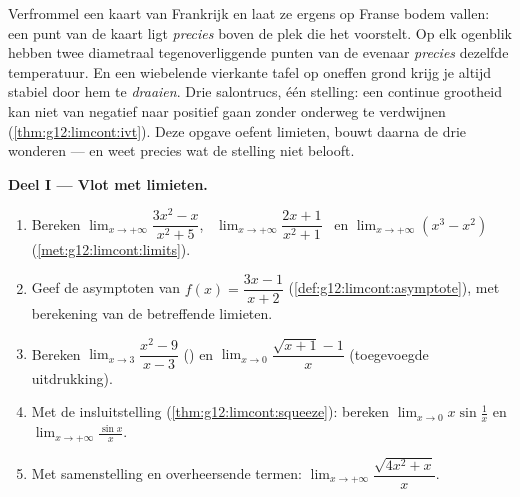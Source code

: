 \begin{problem}
\label{pb:g12:limcont:1}
Verfrommel een kaart van Frankrijk en laat ze ergens op Franse bodem vallen:
een punt van de kaart ligt \emph{precies} boven de plek die het voorstelt. Op
elk ogenblik hebben twee diametraal tegenoverliggende punten van de evenaar
\emph{precies} dezelfde temperatuur. En een wiebelende vierkante tafel op
oneffen grond krijg je altijd stabiel door hem te \emph{draaien}. Drie
salontrucs, één stelling: een continue grootheid kan niet van negatief naar
positief gaan zonder onderweg te verdwijnen (\cref{thm:g12:limcont:ivt}). Deze
opgave oefent limieten, bouwt daarna de drie wonderen --- en weet precies wat
de stelling niet belooft.

\medskip
\noindent\textbf{Deel I --- Vlot met limieten.}
\begin{enumerate}
  \item Bereken $\lim_{x \to +\infty} \dfrac{3x^2 - x}{x^2 + 5}$, \
        $\lim_{x \to +\infty} \dfrac{2x + 1}{x^2 + 1}$ \ en
        $\lim_{x \to +\infty} (x^3 - x^2)$
        (\cref{met:g12:limcont:limits}).
  \item Geef de asymptoten van $f(x) = \dfrac{3x - 1}{x + 2}$
        (\cref{def:g12:limcont:asymptote}), met berekening van de betreffende
        limieten.
  \item Bereken $\lim_{x \to 3} \dfrac{x^2 - 9}{x - 3}$ () en
        $\lim_{x \to 0} \dfrac{\sqrt{x + 1} - 1}{x}$ (toegevoegde
        uitdrukking).
  \item Met de insluitstelling (\cref{thm:g12:limcont:squeeze}): bereken
        $\lim_{x \to 0} x \sin\frac1x$ en
        $\lim_{x \to +\infty} \frac{\sin x}{x}$.
  \item Met samenstelling en overheersende termen:
        $\lim_{x \to +\infty} \dfrac{\sqrt{4x^2 + x}}{x}$.
\end{enumerate}


\end{problem}
